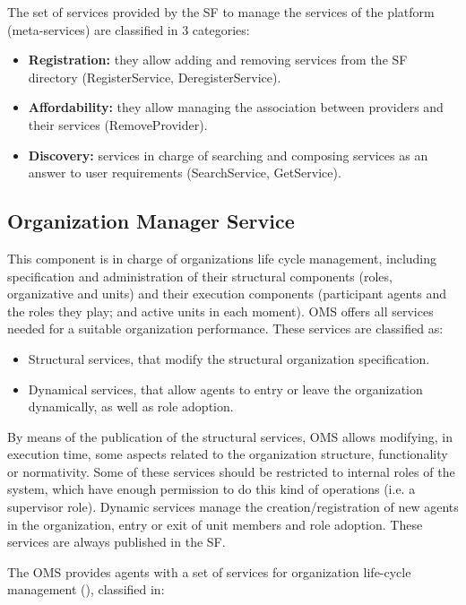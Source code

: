 The set of services provided by the SF to manage the services of the platform (meta-services) are classified in 3 categories:

\begin{itemize}
	\item \textbf{Registration:} they allow adding and removing services from the SF directory (RegisterService, DeregisterService).
	\item \textbf{Affordability:} they allow managing the association between providers and their services (RemoveProvider).
	\item \textbf{Discovery:} services in charge of searching and composing services as an answer to user requirements (SearchService, GetService).
\end{itemize}

\subsection{Organization Manager Service}
This component is in charge of organizations life cycle management, including specification and administration of their structural components (roles, organizative and units) and their execution components (participant agents and the roles they play; and active units in each moment). OMS offers all services needed for a suitable organization performance. These services are classified as:

\begin{itemize}
	\item Structural services, that modify the structural organization specification.
	\item Dynamical services, that allow agents to entry or leave the organization dynamically, as well as role adoption.
\end{itemize}

By means of the publication of the structural services, OMS allows modifying, in execution time, some aspects related to the organization structure, functionality or normativity. Some of these services should be restricted to internal roles of the system, which have enough permission to do this kind of operations (i.e. a supervisor role). Dynamic services manage the creation/registration of new agents in the organization, entry or exit of unit members and role adoption. These services are always published in the SF.

The OMS provides agents with a set of services for organization life-cycle management (\cite{DelVal09}), classified in:

